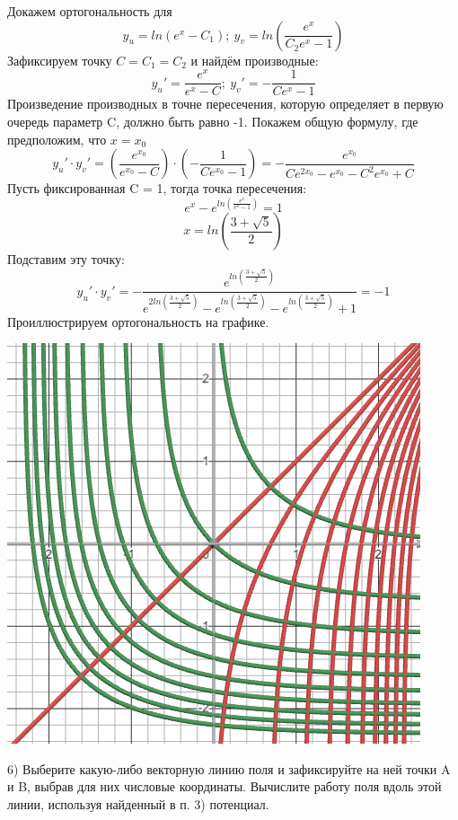 \documentclass{article}
\begin{document}
Докажем ортогональность для
\begin{equation*}
    y_u = ln(e^x-C_1); \ y_v = ln\left(\frac{e^x}{C_2e^x-1}\right)
\end{equation*}
Зафиксируем точку $C = C_1 = C_2$ и найдём производные:
\begin{equation*}
    y_u' = \frac{e^x}{e^x-C}; \ y_v' = -\frac{1}{Ce^x-1}
\end{equation*}
Произведение производных в точне пересечения, которую определяет в первую очередь параметр C, должно быть равно -1. Покажем общую формулу, где предположим, что $x=x_0$
\begin{equation*}
    y_u'\cdot y_v' =(\frac{e^{x_0}}{e^{x_0}-C})\cdot (-\frac{1}{Ce^{x_0}-1}) = - \frac{e^{x_0}}{Ce^{2x_0}-e^{x_0}-C^2e^{x_0}+C}
\end{equation*}
Пусть фиксированная C = 1, тогда точка пересечения:
\begin{equation*}
    e^x-e^{ln(\frac{e^x}{e^x-1})} = 1
\end{equation*}
\begin{equation*}
    x= ln\left(\frac{3+\sqrt{5}}{2}\right)
\end{equation*}
Подставим эту точку:
\begin{equation*}
    y_u'\cdot y_v' = - \frac{e^{ln\left(\frac{3+\sqrt{5}}{2}\right)}}{e^{2ln\left(\frac{3+\sqrt{5}}{2}\right)}-e^{ln\left(\frac{3+\sqrt{5}}{2}\right)}-e^{ln\left(\frac{3+\sqrt{5}}{2}\right)}+1} = -1
\end{equation*}
Проиллюстрируем ортогональность на графике.
\begin{center}
    \includegraphics[width=.5\textwidth]{double.png}
\end{center}
6) Выберите какую-либо векторную линию поля и зафиксируйте на ней точки A и B, выбрав
для них числовые координаты. Вычислите работу поля вдоль этой линии, используя найденный в п. 3) потенциал.
\end{document}
